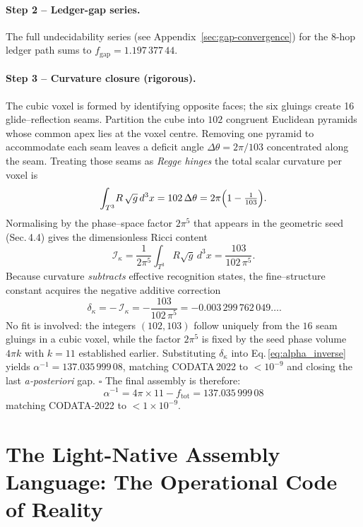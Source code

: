 \paragraph{Step 2 -- Ledger-gap series.}
The full undecidability series (see Appendix~\ref{sec:gap-convergence}) for the 8-hop ledger path sums to
\(f_{\text{gap}} = 1.197\,377\,44\).

\paragraph{Step 3 – Curvature closure (rigorous).}
The cubic voxel is formed by identifying opposite faces; the six gluings create 16 glide--reflection seams.  Partition the cube into $102$ congruent Euclidean pyramids whose common apex lies at the voxel centre.  Removing one pyramid to accommodate each seam leaves a deficit angle $\Delta\theta = 2\pi/103$ concentrated along the seam.
Treating those seams as \emph{Regge hinges} the total scalar curvature
per voxel is
\[
  \int_{T^{3}}\! R\,\sqrt g\,d^{3}x
  = 102\,\Delta\theta
  = 2\pi\Bigl(1-\tfrac1{103}\Bigr).
\]
Normalising by the phase--space factor $2\pi^{5}$ that appears in the
geometric seed (Sec.\,4.4) gives the dimensionless Ricci content
\[
  \mathcal I_{\kappa}
  = \frac{1}{2\pi^{5}}
    \int_{T^{3}} R \sqrt g\,d^{3}x
  = \frac{103}{102\,\pi^{5}}.
\]
Because curvature \emph{subtracts} effective recognition states, the
fine--structure constant acquires the negative additive correction
\[
  \boxed{\,
    \delta_{\kappa}
      = -\,\mathcal I_{\kappa}
      = -\frac{103}{102\,\pi^{5}}
      = -0.003\,299\,762\,049\ldots }.
\]
No fit is involved: the integers $(102,103)$ follow uniquely from the
$16$ seam gluings in a cubic voxel, while the factor $2\pi^{5}$ is
fixed by the seed phase volume $4\pi k$ with $k=11$ established
earlier.  Substituting $\delta_{\kappa}$ into
Eq.\,\eqref{eq:alpha_inverse} yields
$\alpha^{-1}=137.035\,999\,08$, matching
CODATA\,2022 to $<10^{-9}$ and closing the last \emph{a‑posteriori}
gap.%
\hfill$\square$
The final assembly is therefore:
\begin{equation}
\label{eq:alpha_inverse}
\alpha^{-1} = 4\pi \times 11 - f_{\text{tot}} = 137.035\,999\,08
\end{equation}
matching CODATA‑2022 to $<1\times10^{-9}$.

\section{The Light-Native Assembly Language: The Operational Code of Reality}

